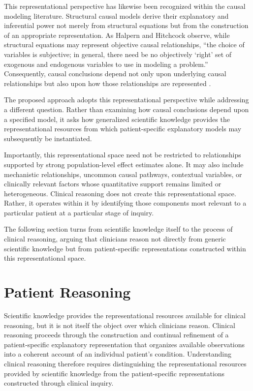 \documentclass[11pt]{article}
\begin{document}
This representational perspective has likewise been recognized within the causal modeling literature. Structural causal models derive their explanatory and inferential power not merely from structural equations but from the construction of an appropriate representation. As Halpern and Hitchcock observe, while structural equations may represent objective causal relationships, ``the choice of variables is subjective; in general, there need be no objectively `right' set of exogenous and endogenous variables to use in modeling a problem.'' Consequently, causal conclusions depend not only upon underlying causal relationships but also upon how those relationships are represented \parencite{halpern_actual_2011}.

The proposed approach adopts this representational perspective while addressing a different question. Rather than examining how causal conclusions depend upon a specified model, it asks how generalized scientific knowledge provides the representational resources from which patient-specific explanatory models may subsequently be instantiated.

Importantly, this representational space need not be restricted to relationships supported by strong population-level effect estimates alone. It may also include mechanistic relationships, uncommon causal pathways, contextual variables, or clinically relevant factors whose quantitative support remains limited or heterogeneous. Clinical reasoning does not create this representational space. Rather, it operates within it by identifying those components most relevant to a particular patient at a particular stage of inquiry.

The following section turns from scientific knowledge itself to the process of clinical reasoning, arguing that clinicians reason not directly from generic scientific knowledge but from patient-specific representations constructed within this representational space.

\section{Patient Reasoning}

Scientific knowledge provides the representational resources available for clinical reasoning, but it is not itself the object over which clinicians reason. Clinical reasoning proceeds through the construction and continual refinement of a patient-specific explanatory representation that organizes available observations into a coherent account of an individual patient's condition. Understanding clinical reasoning therefore requires distinguishing the representational resources provided by scientific knowledge from the patient-specific representations constructed through clinical inquiry.
\end{document}
